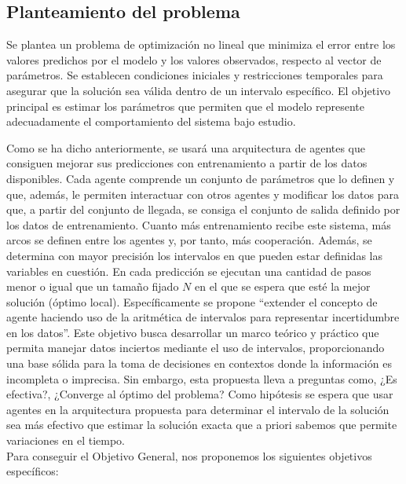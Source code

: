 \documentclass{article}
\begin{document}
\subsection*{Planteamiento del problema} 

Se plantea un problema de optimización no lineal que minimiza el error entre los valores predichos por el modelo y los valores observados, respecto al vector de parámetros. Se establecen condiciones iniciales y restricciones temporales para asegurar que la solución sea válida dentro de un intervalo específico. El objetivo principal es estimar los parámetros que permiten que el modelo represente adecuadamente el comportamiento del sistema bajo estudio.

Como se ha dicho anteriormente, se usará una arquitectura de agentes que consiguen mejorar sus predicciones con entrenamiento a partir de los datos disponibles. Cada agente comprende un conjunto de parámetros que lo definen y que, además, le permiten interactuar con otros agentes y modificar los datos para que, a partir del conjunto de llegada, se consiga el conjunto de salida definido por los datos de entrenamiento. Cuanto más entrenamiento recibe este sistema, más arcos se definen entre los agentes y, por tanto, más cooperación. Además, se determina con mayor precisión los intervalos en que pueden estar definidas las variables en cuestión. En cada predicción se ejecutan una cantidad de pasos menor o igual que un tamaño fijado $N$ en el que se espera que esté la mejor solución (óptimo local). Específicamente se propone ``extender el concepto de agente haciendo uso de la aritmética de intervalos para representar incertidumbre en los datos''. Este objetivo busca desarrollar un marco teórico y práctico que permita manejar datos inciertos mediante el uso de intervalos, proporcionando una base sólida para la toma de decisiones en contextos donde la información es incompleta o imprecisa. Sin embargo, esta propuesta lleva a preguntas como, ¿Es efectiva?, ¿Converge al óptimo del problema? Como hipótesis se espera que usar agentes en la arquitectura propuesta para determinar el intervalo de la solución sea más efectivo que estimar la solución exacta que a priori sabemos que permite variaciones en el tiempo. \\

Para conseguir el Objetivo General, nos proponemos los siguientes objetivos específicos:
\end{document}
